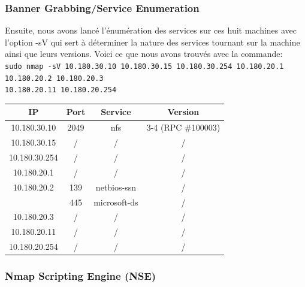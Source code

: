 \documentclass[french,paper=a4,oneside,captions=tableheading]{article}
\begin{document}
\subsubsection{Banner Grabbing/Service Enumeration}

Ensuite, nous avons lancé l'énumération des services sur ces huit machines avec l'option -sV qui sert à déterminer la nature des services tournant sur la machine ainsi que leurs versions. Voici ce que nous avons trouvés avec la commande: \\
\texttt{sudo nmap -sV 10.180.30.10 10.180.30.15 10.180.30.254 10.180.20.1 10.180.20.2 10.180.20.3} \\ \texttt{10.180.20.11 10.180.20.254}
\begin{center}
    \begin{tabular}{|c|c|c|c|} \hline
        \textbf{IP}   & \textbf{Port} & \textbf{Service} & \textbf{Version}  \\ \hline \hline
        10.180.30.10  & 2049          & nfs              & 3-4 (RPC \#100003) \\ \hline
        10.180.30.15  & /             & /                & /                 \\ \hline
        10.180.30.254 & /             & /                & /                 \\ \hline
        10.180.20.1   & /             & /                & /                 \\ \hline
        10.180.20.2   & 139           & netbios-ssn      & /                 \\
                      & 445           & microsoft-ds     & /                 \\ \hline
        10.180.20.3   & /             & /                & /                 \\ \hline
        10.180.20.11  & /             & /                & /                 \\ \hline
        10.180.20.254 & /             & /                & /                 \\ \hline
    \end{tabular}
\end{center}



\subsubsection{Nmap Scripting Engine (NSE)}
\end{document}

